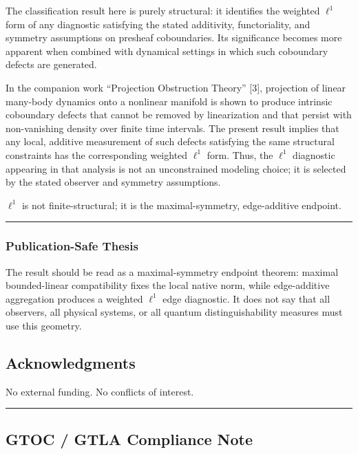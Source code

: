 \documentclass[
  11pt,
]{article}
\begin{document}
The classification result here is purely structural: it identifies the weighted \(\ell^1\) form of any diagnostic satisfying the stated additivity, functoriality, and symmetry assumptions on presheaf coboundaries. Its significance becomes more apparent when combined with dynamical settings in which such coboundary defects are generated.

In the companion work ``Projection Obstruction Theory'' {[}3{]}, projection of linear many-body dynamics onto a nonlinear manifold is shown to produce intrinsic coboundary defects that cannot be removed by linearization and that persist with non-vanishing density over finite time intervals. The present result implies that any local, additive measurement of such defects satisfying the same structural constraints has the corresponding weighted \(\ell^1\) form. Thus, the \(\ell^1\) diagnostic appearing in that analysis is not an unconstrained modeling choice; it is selected by the stated observer and symmetry assumptions.

\(\ell^1\) is not finite-structural; it is the maximal-symmetry, edge-additive endpoint.

\begin{center}\rule{0.5\linewidth}{0.5pt}\end{center}

\subsubsection{Publication-Safe Thesis}\label{publication-safe-thesis}

The result should be read as a maximal-symmetry endpoint theorem: maximal bounded-linear compatibility fixes the local native norm, while edge-additive aggregation produces a weighted \(\ell^1\) edge diagnostic. It does not say that all observers, all physical systems, or all quantum distinguishability measures must use this geometry.

\subsection{Acknowledgments}\label{acknowledgments}

No external funding. No conflicts of interest.

\begin{center}\rule{0.5\linewidth}{0.5pt}\end{center}

\subsection{GTOC / GTLA Compliance Note}\label{gtoc-gtla-compliance-note}
\end{document}
